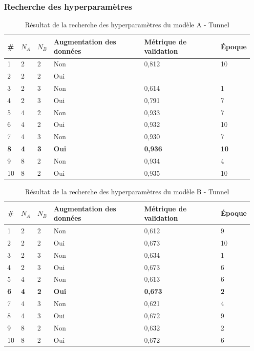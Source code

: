 \subsubsection{Recherche des hyperparamètres}
    \begin{table}[H]
        \centering
        \caption{Résultat de la recherche des hyperparamètres du modèle A - Tunnel}
        \label{tab:resultat_tunnel_modele_a}
        \begin{tabular}{lllp{3cm}p{3cm}l}
            \midrule
            \# & \(N_A\) & \(N_B\) & Augmentation des données & Métrique de validation & Époque\\
            \midrule\midrule
            1  & 2 & 2 & Non & 0,812 & 10\\
            2  & 2 & 2 & Oui & \\
            3  & 2 & 3 & Non & 0,614 & 1\\
            4  & 2 & 3 & Oui & 0,791 & 7\\
            5  & 4 & 2 & Non & 0,933 & 7\\
            6  & 4 & 2 & Oui & 0,932 & 10\\
            7  & 4 & 3 & Non & 0,930 & 7\\
            \textbf{8}  & \textbf{4} & \textbf{3} & \textbf{Oui} & \textbf{0,936} & \textbf{10}\\
            9  & 8 & 2 & Non & 0,934 & 4\\
            10 & 8 & 2 & Oui & 0,935 & 10\\
            \midrule
        \end{tabular}
    \end{table}

    \begin{table}[H]
        \centering
        \caption{Résultat de la recherche des hyperparamètres du modèle B - Tunnel}
        \label{tab:resultat_tunnel_modele_b}
        \begin{tabular}{lllp{3cm}p{3cm}l}
            \midrule
            \# & \(N_A\) & \(N_B\) & Augmentation des données & Métrique de validation & Époque\\
            \midrule\midrule
            1  & 2 & 2 & Non & 0,612 & 9\\
            2  & 2 & 2 & Oui & 0,673 & 10\\
            3  & 2 & 3 & Non & 0,634 & 1\\
            4  & 2 & 3 & Oui & 0,673 & 6\\
            5  & 4 & 2 & Non & 0,613 & 6\\
            \textbf{6}  & \textbf{4} & \textbf{2} & \textbf{Oui} & \textbf{0,673} & \textbf{2}\\
            7  & 4 & 3 & Non & 0,621 & 4\\
            8  & 4 & 3 & Oui & 0,672 & 9\\
            9  & 8 & 2 & Non & 0,632 & 2\\
            10 & 8 & 2 & Oui & 0,672 & 6\\
            \midrule
        \end{tabular}
    \end{table}

